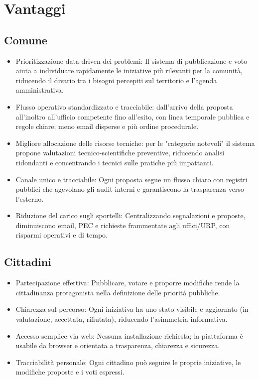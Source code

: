 \section{Vantaggi}

\subsection{Comune}

\begin{itemize}
  \item Prioritizzazione data-driven dei problemi: Il sistema di pubblicazione e 
  voto aiuta a individuare rapidamente le iniziative più rilevanti per la 
  comunità, riducendo il divario tra i bisogni percepiti sul territorio e l'agenda 
  amministrativa.

  \item Flusso operativo standardizzato e tracciabile: dall'arrivo della proposta 
  all'inoltro all'ufficio competente fino all'esito, con linea temporale pubblica e 
  regole chiare; meno email disperse e più ordine procedurale.

  \item Migliore allocazione delle risorse tecniche: per le "categorie notevoli" 
  il sistema propone valutazioni tecnico-scientifiche preventive, riducendo 
  analisi ridondanti e concentrando i tecnici sulle pratiche più impattanti.

  \item Canale unico e tracciabile: Ogni proposta segue un flusso chiaro 
  con registri pubblici che agevolano gli audit interni e garantiscono la 
  trasparenza verso l'esterno.

  \item Riduzione del carico sugli sportelli: Centralizzando segnalazioni e 
  proposte, diminuiscono email, PEC e richieste frammentate agli uffici/URP, 
  con risparmi operativi e di tempo.
\end{itemize}

\subsection{Cittadini}

\begin{itemize}
  \item Partecipazione effettiva: Pubblicare, votare e proporre modifiche rende 
  la cittadinanza protagonista nella definizione delle priorità pubbliche.

  \item Chiarezza sul percorso: Ogni iniziativa ha uno stato visibile e aggiornato 
  (in valutazione, accettata, rifiutata), riducendo l'asimmetria informativa.

  \item Accesso semplice via web: Nessuna installazione richiesta; la piattaforma 
  è usabile da browser e orientata a trasparenza, chiarezza e sicurezza.

  \item Tracciabilità personale: Ogni cittadino può seguire le proprie iniziative, 
  le modifiche proposte e i voti espressi.
\end{itemize}


